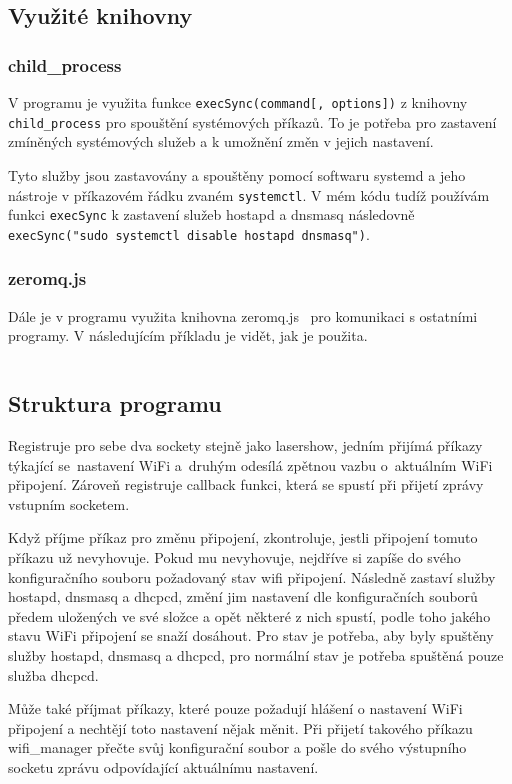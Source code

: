 \subsection{Využité knihovny}
\subsubsection{child\_process}
V programu je využita funkce \texttt{execSync(command[, options])} z knihovny \texttt{child_process} pro spouštění systémových příkazů. To je potřeba pro zastavení zmíněných systémových služeb a k umožnění změn v jejich nastavení.

Tyto služby jsou zastavovány a spouštěny pomocí softwaru systemd a jeho nástroje v příkazovém řádku zvaném \texttt{systemctl}.
V mém kódu tudíž používám funkci \texttt{execSync} k zastavení služeb hostapd a dnsmasq následovně \texttt{execSync("sudo systemctl disable hostapd dnsmasq")}.

\subsubsection{zeromq.js}
Dále je v programu využita knihovna zeromq.js~\cite{zeromqjs} pro komunikaci s ostatními programy. V následujícím příkladu je vidět, jak je použita.

\inputminted[frame=lines,fontsize=\footnotesize{}, linenos, breaklines]{js}{code_examples/zmq_server.js}

\subsection{Struktura programu}

Registruje pro sebe dva sockety stejně jako lasershow, jedním přijímá příkazy týkající se~nastavení WiFi a~druhým odesílá zpětnou vazbu o~aktuálním WiFi připojení. Zároveň registruje callback funkci, která se spustí při přijetí zprávy vstupním socketem.

Když příjme příkaz pro změnu připojení, zkontroluje, jestli připojení tomuto příkazu už nevyhovuje. Pokud mu nevyhovuje, nejdříve si zapíše do svého konfiguračního souboru požadovaný stav wifi připojení. Následně zastaví služby hostapd, dnsmasq a dhcpcd, změní jim nastavení dle konfiguračních souborů předem uložených ve své složce a opět některé z nich spustí, podle toho jakého stavu WiFi připojení se snaží dosáhout.
Pro  stav je potřeba, aby byly spuštěny služby hostapd, dnsmasq a dhcpcd, pro normální  stav je potřeba spuštěná pouze služba dhcpcd.

Může také příjmat příkazy, které pouze požadují hlášení o nastavení WiFi připojení a nechtějí toto nastavení nějak měnit. Při přijetí takového příkazu wifi\_manager přečte svůj konfigurační soubor a pošle do svého výstupního socketu zprávu odpovídající aktuálnímu nastavení.
